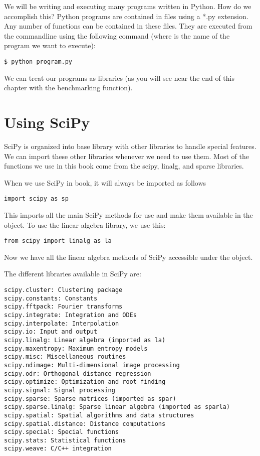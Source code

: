 We will be writing and executing many programs written in Python.  How do we accomplish this?  Python programs are contained in files using a *.py extension.  Any number of functions can be contained in these files.  They are executed from the commandline using the following command (where  is the name of the program we want to execute):
\begin{lstlisting}
$ python program.py
\end{lstlisting}

We can treat our programs as libraries (as you will see near the end of this chapter with the benchmarking function).

\section*{Using SciPy}
SciPy is organized into base library with other libraries to handle special features.  We can import these other libraries whenever we need to use them.  Most of the functions we use in this book come from the scipy, linalg, and sparse libraries.

When we use SciPy in book, it will always be imported as follows
\begin{lstlisting}
import scipy as sp
\end{lstlisting}

This imports all the main SciPy methods for use and make them available in the  object.  To use the linear algebra library, we use this:
\begin{lstlisting}
from scipy import linalg as la
\end{lstlisting}

Now we have all the linear algebra methods of SciPy accessible under the  object.

The different libraries available in SciPy are:
\begin{lstlisting}
scipy.cluster: Clustering package
scipy.constants: Constants
scipy.fftpack: Fourier transforms
scipy.integrate: Integration and ODEs
scipy.interpolate: Interpolation
scipy.io: Input and output
scipy.linalg: Linear algebra (imported as la)
scipy.maxentropy: Maximum entropy models
scipy.misc: Miscellaneous routines
scipy.ndimage: Multi-dimensional image processing
scipy.odr: Orthogonal distance regression
scipy.optimize: Optimization and root finding
scipy.signal: Signal processing
scipy.sparse: Sparse matrices (imported as spar)
scipy.sparse.linalg: Sparse linear algebra (imported as sparla)
scipy.spatial: Spatial algorithms and data structures
scipy.spatial.distance: Distance computations
scipy.special: Special functions
scipy.stats: Statistical functions
scipy.weave: C/C++ integration
\end{lstlisting}

